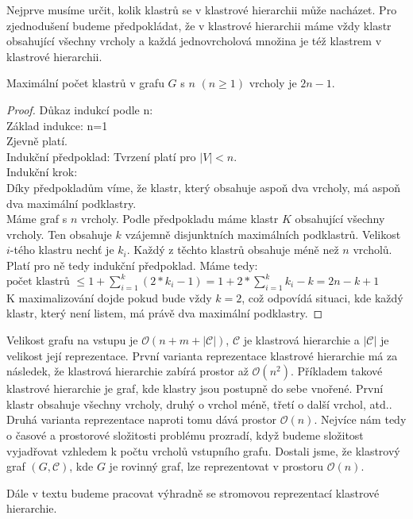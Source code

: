 Nejprve musíme určit, kolik klastrů se v klastrové hierarchii může nacházet.
Pro zjednodušení budeme předpokládat, že v klastrové hierarchii máme vždy klastr obsahující všechny vrcholy a každá jednovrcholová množina je též klastrem v klastrové hierarchii.
\begin{tvr}
Maximální počet klastrů v grafu $G$ s $n$ $(n \geq 1)$ vrcholy je $2n-1$.
\end{tvr}
\begin{proof}
Důkaz indukcí podle n: \\
Základ indukce: n=1 \\
Zjevně platí. \\
Indukční předpoklad: Tvrzení platí pro $|V| < n$.\\
Indukční krok:  \\
Díky předpokladům víme, že klastr, který obsahuje aspoň dva vrcholy, má aspoň dva maximální podklastry. \\
Máme graf s $n$ vrcholy. Podle předpokladu máme klastr $K$ obsahující všechny vrcholy. Ten obsahuje $k$ vzájemně disjunktních maximálních podklastrů. Velikost $i$-tého klastru nechť je $k_i$. Každý z těchto klastrů obsahuje méně než $n$ vrcholů. Platí pro ně tedy indukční předpoklad. Máme tedy: \\
$\text{počet klastrů } \leq 1 + \sum\limits_{i=1}^k (2*k_i-1) = 1 + 2*\sum\limits_{i=1}^k k_i - k = 2n - k + 1 $\\
K maximalizování dojde pokud bude vždy $k=2$, což odpovídá situaci, kde každý klastr, který není listem, má právě dva maximální podklastry.
\end{proof}

Velikost grafu na vstupu je  $\mathcal{O}(n+m+| \mathcal C|)$, $\mathcal C$ je klastrová hierarchie a $| \mathcal C|$ je velikost její reprezentace. První varianta reprezentace klastrové hierarchie má za následek, že klastrová hierarchie zabírá prostor až $\mathcal{O}(n^2)$. Příkladem takové klastrové hierarchie je graf, kde klastry jsou postupně do sebe vnořené. První klastr obsahuje všechny vrcholy, druhý o vrchol méně, třetí o další vrchol, atd..
Druhá varianta reprezentace naproti tomu dává prostor $\mathcal{O}(n)$. Nejvíce nám tedy o časové a prostorové složitosti problému prozradí, když budeme složitost vyjadřovat vzhledem k počtu vrcholů vstupního grafu. Dostali jsme, že klastrový graf $(G,\mathcal C )$, kde $G$ je rovinný graf, lze reprezentovat v prostoru $\mathcal O (n)$.

Dále v textu budeme pracovat výhradně se stromovou reprezentací klastrové hierarchie.

